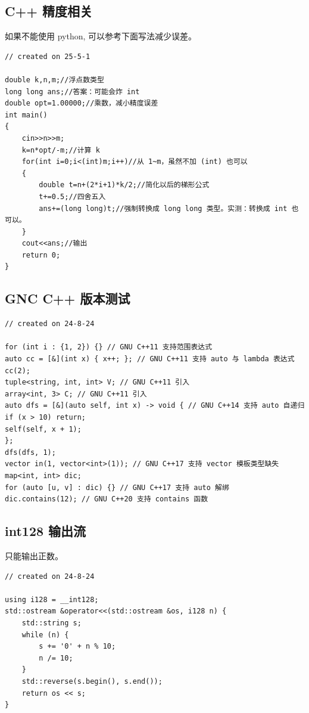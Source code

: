 \documentclass[a4paper,12pt]{article}
\begin{document}
\subsection{C++ 精度相关}

\noindent 如果不能使用 python, 可以参考下面写法减少误差。

\begin{lstlisting}
// created on 25-5-1

double k,n,m;//浮点数类型
long long ans;//答案：可能会炸 int
double opt=1.00000;//乘数，减小精度误差
int main()
{
    cin>>n>>m;
    k=n*opt/-m;//计算 k
    for(int i=0;i<(int)m;i++)//从 1~m，虽然不加 (int) 也可以
    {
        double t=n+(2*i+1)*k/2;//简化以后的梯形公式
        t+=0.5;//四舍五入
        ans+=(long long)t;//强制转换成 long long 类型。实测：转换成 int 也可以。
    }
    cout<<ans;//输出
    return 0;
}    
\end{lstlisting}

\subsection{GNC C++ 版本测试}

\begin{lstlisting}
// created on 24-8-24

for (int i : {1, 2}) {} // GNU C++11 支持范围表达式
auto cc = [&](int x) { x++; }; // GNU C++11 支持 auto 与 lambda 表达式
cc(2);
tuple<string, int, int> V; // GNU C++11 引入
array<int, 3> C; // GNU C++11 引入
auto dfs = [&](auto self, int x) -> void { // GNU C++14 支持 auto 自递归
if (x > 10) return;
self(self, x + 1);
};
dfs(dfs, 1);
vector in(1, vector<int>(1)); // GNU C++17 支持 vector 模板类型缺失
map<int, int> dic;
for (auto [u, v] : dic) {} // GNU C++17 支持 auto 解绑
dic.contains(12); // GNU C++20 支持 contains 函数   
\end{lstlisting}

\subsection{int128 输出流}

\noindent 只能输出正数。

\begin{lstlisting}
// created on 24-8-24

using i128 = __int128;
std::ostream &operator<<(std::ostream &os, i128 n) {
    std::string s;
    while (n) {
        s += '0' + n % 10;
        n /= 10;
    }
    std::reverse(s.begin(), s.end());
    return os << s;
}
\end{lstlisting}
\end{document}
